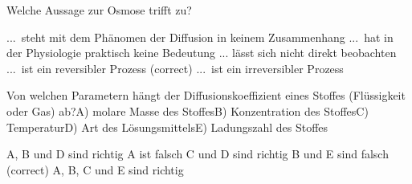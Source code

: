 \documentclass[11pt]{exam}
\begin{document}
\begin{questions}
\vspace{3mm}\question Welche Aussage zur Osmose trifft zu?

\begin{choices}
	\choice ... steht mit dem Phänomen der Diffusion in keinem Zusammenhang
	\choice ... hat in der Physiologie praktisch keine Bedeutung
	\choice ... lässt sich nicht direkt beobachten
	\choice ... ist ein reversibler Prozess (correct)
	\choice ... ist ein irreversibler Prozess
\end{choices}

\vspace{3mm}\question Von welchen Parametern hängt der Diffusionskoeffizient eines Stoffes (Flüssigkeit oder Gas) ab?A) molare Masse des StoffesB) Konzentration des StoffesC) TemperaturD) Art des LösungsmittelsE) Ladungszahl des Stoffes

\begin{choices}
	\choice A, B und D sind richtig
	\choice A ist falsch
	\choice C und D sind richtig
	\choice B und E sind falsch (correct)
	\choice A, B, C und E sind richtig
\end{choices}

\vspace{3mm}\end{questions}
\end{document}
